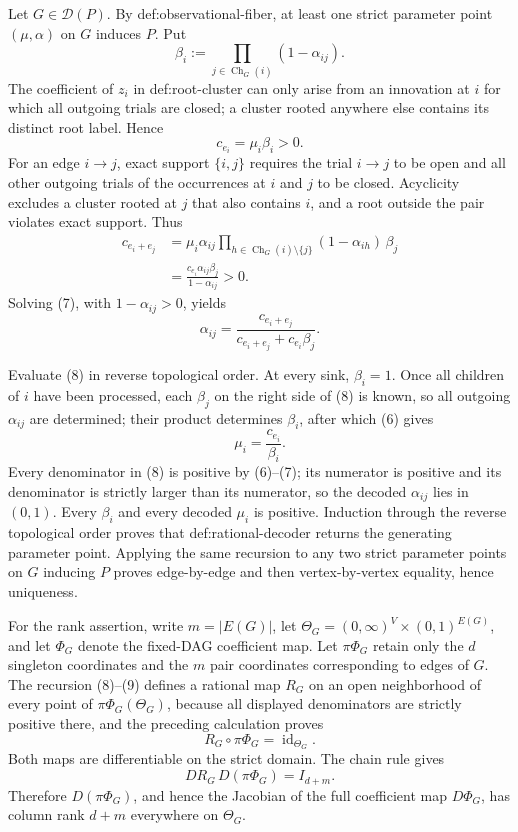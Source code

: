 Let \(G\in\mathcal D(P)\).  By def:observational-fiber, at least one strict parameter point \((\mu,\alpha)\) on \(G\) induces \(P\).  Put
\[
 \beta_i:=\prod_{j\in\operatorname{Ch}_G(i)}(1-\alpha_{ij}).
\]
The coefficient of \(z_i\) in def:root-cluster can only arise from an innovation at \(i\) for which all outgoing trials are closed; a cluster rooted anywhere else contains its distinct root label.  Hence
\[
 c_{e_i}=\mu_i\beta_i>0.
\tag{6}
\]
For an edge \(i\to j\), exact support \(\{i,j\}\) requires the trial \(i\to j\) to be open and all other outgoing trials of the occurrences at \(i\) and \(j\) to be closed.  Acyclicity excludes a cluster rooted at \(j\) that also contains \(i\), and a root outside the pair violates exact support.  Thus
\[
 \begin{aligned}
 c_{e_i+e_j}
 &=\mu_i\alpha_{ij}
   \prod_{h\in\operatorname{Ch}_G(i)\setminus\{j\}}(1-\alpha_{ih})\,\beta_j\\
 &=\frac{c_{e_i}\alpha_{ij}\beta_j}{1-\alpha_{ij}}>0.
 \end{aligned}
\tag{7}
\]
Solving (7), with \(1-\alpha_{ij}>0\), yields
\[
 \alpha_{ij}
 =\frac{c_{e_i+e_j}}
        {c_{e_i+e_j}+c_{e_i}\beta_j}.
\tag{8}
\]

Evaluate (8) in reverse topological order.  At every sink, \(\beta_i=1\).  Once all children of \(i\) have been processed, each \(\beta_j\) on the right side of (8) is known, so all outgoing \(\alpha_{ij}\) are determined; their product determines \(\beta_i\), after which (6) gives
\[
 \mu_i=\frac{c_{e_i}}{\beta_i}.
\tag{9}
\]
Every denominator in (8) is positive by (6)--(7); its numerator is positive and its denominator is strictly larger than its numerator, so the decoded \(\alpha_{ij}\) lies in \((0,1)\).  Every \(\beta_i\) and every decoded \(\mu_i\) is positive.  Induction through the reverse topological order proves that def:rational-decoder returns the generating parameter point.  Applying the same recursion to any two strict parameter points on \(G\) inducing \(P\) proves edge-by-edge and then vertex-by-vertex equality, hence uniqueness.

For the rank assertion, write \(m=|E(G)|\), let \(\Theta_G=(0,\infty)^V\times(0,1)^{E(G)}\), and let \(\Phi_G\) denote the fixed-DAG coefficient map.  Let \(\pi\Phi_G\) retain only the \(d\) singleton coordinates and the \(m\) pair coordinates corresponding to edges of \(G\).  The recursion (8)--(9) defines a rational map \(R_G\) on an open neighborhood of every point of \(\pi\Phi_G(\Theta_G)\), because all displayed denominators are strictly positive there, and the preceding calculation proves
\[
 R_G\circ\pi\Phi_G=\operatorname{id}_{\Theta_G}.
\]
Both maps are differentiable on the strict domain.  The chain rule gives
\[
 D R_G\,D(\pi\Phi_G)=I_{d+m}.
\]
Therefore \(D(\pi\Phi_G)\), and hence the Jacobian of the full coefficient map \(D\Phi_G\), has column rank \(d+m\) everywhere on \(\Theta_G\).

